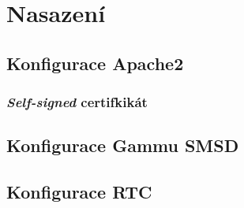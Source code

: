 \chapter{Nasazení}
\label{sec:dp}



\section{Konfigurace Apache2}

\subsection{\textit{Self-signed} certifkikát}

\section{Konfigurace Gammu SMSD}

\section{Konfigurace RTC}